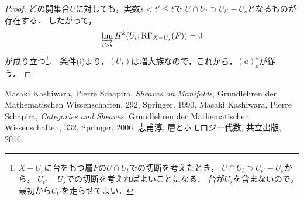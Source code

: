 \begin{proof}
    どの開集合\(U\)に対しても，実数\(s<t'\leqq t\)で
    \(U\cap U_t\supset U_{t'}-U_s\)となるものが存在する．
    したがって，
    \[
        \indlim[t>s]H^k(U_t;\RG_{X-U_s}(F))=0
    \]
    が成り立つ\footnote{
        \(X-U_s\)に台をもつ層\(F\)の\(U\cap U_t\)での切断を考えたとき，
        \(U\cap U_t\supset U_{t'}-U_s\)から，
        \(U_{t'}-U_s\)での切断を考えればよいことになる．
        台が\(U_s\)を含まないので，最初から\(U_{t'}\)を走らせてよい．
    }．
    条件(i)より，\((U_t)\)は増大族なので，これから，\((a)_k^s\)が従う．
\end{proof}
\begin{thebibliography}{20} 
     Masaki Kashiwara, Pierre Schapira, 
        \textit{Sheaves on Manifolds}, 
        Grundlehren der Mathematischen Wissenschaften, 292, Springer, 1990.
         Masaki Kashiwara, Pierre Schapira, 
        \textit{Categories and Sheaves}, 
        Grundlehren der Mathematischen Wissenschaften, 332, Springer, 2006.
         志甫淳, 層とホモロジー代数, 共立出版, 2016.
\end{thebibliography}


